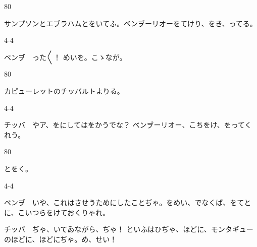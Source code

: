\documentclass[tate,paper=b6j,jafontsize=9pt]{jlreq}
\begin{document}
\begin{azconvIndented}{8\zw}{0\zw}

サンプソンとエブラハムとをいてふ。ベンヺーリオーをてけり、をき、ってる。

\end{azconvIndented}
\begin{azconvIndented}{4\zw}{-4\zw}

ベンヺ　った{〳〵}！ めいを。こゝなが。

\end{azconvIndented}
\begin{azconvIndented}{8\zw}{0\zw}

カピューレットのチッバルトよりる。

\end{azconvIndented}
\begin{azconvIndented}{4\zw}{-4\zw}

チッバ　やア、をにしてはをかうでな？ ベンヺーリオー、こちをけ、をってくれう。

\end{azconvIndented}
\begin{azconvIndented}{8\zw}{0\zw}

とをく。

\end{azconvIndented}
\begin{azconvIndented}{4\zw}{-4\zw}

ベンヺ　いや、これはさせうためにしたことぢゃ。をめい、でなくば、をてとに、こいつらをけておくりゃれ。

チッバ　ぢゃ、いてゐながら、ぢゃ！ といふはひぢゃ、ほどに、モンタギューのほどに、ほどにぢゃ。め、せい！

\end{azconvIndented}
\end{document}
